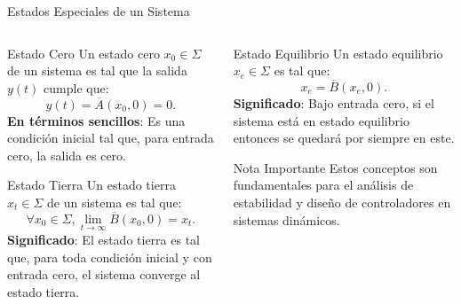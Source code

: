 \documentclass[
    10pt,
    aspectratio=169,
    xcolor={dvipsnames},
    spanish,
    ]{beamer}
\begin{document}
\begin{frame}{Estados Especiales de un Sistema}
\begin{columns}
  \begin{column}{0.48\textwidth}
    \begin{block}{Estado Cero}
      \footnotesize
      Un estado cero $x_0 \in \Sigma$ de un sistema es tal que la salida $y(t)$ cumple que:
      \begin{equation}
        y(t) = \overline{A}(x_0, 0) = 0. \tag{1}
      \end{equation}
      \textbf{En términos sencillos}: Es una condición inicial tal que, para entrada cero, la salida es cero.
    \end{block}
    
    \begin{block}{Estado Tierra}
      \footnotesize
      Un estado tierra $x_t \in \Sigma$ de un sistema es tal que:
      \begin{equation}
        \forall x_0 \in \Sigma, \lim_{t \to \infty} \overline{B}(x_0, 0) = x_t. \tag{2}
      \end{equation}
      \textbf{Significado}: El estado tierra es tal que, para toda condición inicial y con entrada cero, el sistema converge al estado tierra.
    \end{block}
  \end{column}
  
  \begin{column}{0.48\textwidth}
    \footnotesize
    \begin{block}{Estado Equilibrio}
      Un estado equilibrio $x_e \in \Sigma$ es tal que:
      \begin{equation}
        x_e = \overline{B}(x_e, 0). \tag{3}
      \end{equation}
      \textbf{Significado}: Bajo entrada cero, si el sistema está en estado equilibrio entonces se quedará por siempre en este.
    \end{block}
    
    \vspace{0.5cm}
    
    \begin{alertblock}{Nota Importante}
      \scriptsize
      Estos conceptos son fundamentales para el análisis de estabilidad y diseño de controladores en sistemas dinámicos.
    \end{alertblock}
  \end{column}
\end{columns}
\end{frame}
\end{document}

